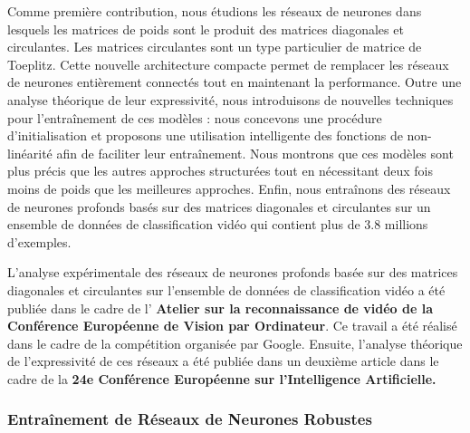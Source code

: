 

Comme première contribution, nous étudions les réseaux de neurones dans lesquels les matrices de poids sont le produit des matrices diagonales et circulantes.
Les matrices circulantes sont un type particulier de matrice de Toeplitz.
Cette nouvelle architecture compacte permet de remplacer les réseaux de neurones entièrement connectés tout en maintenant la performance.
Outre une analyse théorique de leur expressivité, nous introduisons de nouvelles techniques pour l'entraînement de ces modèles : nous concevons une procédure d'initialisation et proposons une utilisation intelligente des fonctions de non-linéarité afin de faciliter leur entraînement.
Nous montrons que ces modèles sont plus précis que les autres approches structurées tout en nécessitant deux fois moins de poids que les meilleures approches.
Enfin, nous entraînons des réseaux de neurones profonds basés sur des matrices diagonales et circulantes sur un ensemble de données de classification vidéo qui contient plus de 3.8 millions d'exemples.

L'analyse expérimentale des réseaux de neurones profonds basée sur des matrices diagonales et circulantes sur l'ensemble de données de classification vidéo a été publiée dans le cadre de l'\textbf{\color{mydarkblue} Atelier sur la reconnaissance de vidéo de la Conférence Européenne de Vision par Ordinateur}.
Ce travail a été réalisé dans le cadre de la compétition \yt organisée par Google.
Ensuite, l'analyse théorique de l'expressivité de ces réseaux a été publiée dans un deuxième article dans le cadre de la \textbf{\color{mydarkblue} 24e Conférence Européenne sur l'Intelligence Artificielle.}



\subsubsection{Entraînement de Réseaux de Neurones Robustes}
\label{subsubsection:ap7-training_robust_neural_networks}

